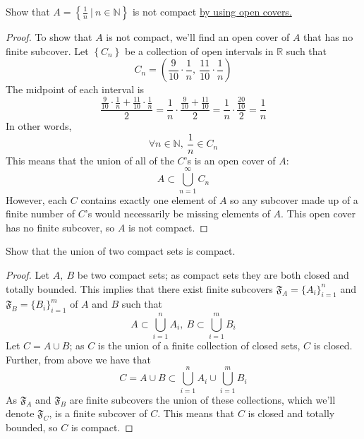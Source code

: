 \documentclass{article}
\newcommand{\parens}[1]{\left(#1\right)}
\newcommand{\bracks}[1]{\left\{#1\right\}}
\newcommand{\R}{\mathbb{R}}
\newcommand{\N}{\mathbb{N}}
\begin{document}
    
    \item Show that $A = \bracks{\frac{1}{n}\ \big|\ n \in \N}$ is 
    not compact \underline{by using open covers.}
    \begin{proof}
    To show that $A$ is not compact, we'll find an open cover of $A$ 
    that has no finite subcover. Let $\bracks{C_n}$ be a collection 
    of open intervals in $\R$ such that 
    $$C_n = \parens{\frac{9}{10}\cdot\frac{1}{n},\ 
    \frac{11}{10}\cdot\frac{1}{n}}$$
    The midpoint of each interval is
    $$\frac{\frac{9}{10}\cdot\frac{1}{n} + 
    \frac{11}{10}\cdot\frac{1}{n}}{2} = \frac{1}{n}\cdot
    \frac{\frac{9}{10}+\frac{11}{10}}{2} = \frac{1}{n}\cdot
    \frac{\frac{20}{10}}{2} = \frac{1}{n}$$
    In other words, 
    $$\forall n \in \N,\ \frac{1}{n} \in C_n$$
    This means that the union of all of the $C$'s is an open cover
    of $A$:
    $$A \subset \bigcup_{n=1}^\infty C_n$$
    However, each $C$ contains exactly one element of $A$ so any
    subcover made up of a finite number of $C$'s would necessarily be
    missing elements of $A$. This open cover has no finite subcover, 
    so $A$ is not compact.  
    \end{proof}
    
    
    \item Show that the union of two compact sets is compact.
    \begin{proof}
    Let $A,\ B$ be two compact sets; as compact sets they are 
    both closed and totally bounded. This implies that there exist 
    finite subcovers $\mathfrak{F}_A = \{A_i\}_{i=1}^n$ and 
    $\mathfrak{F}_B = \{B_i\}_{i=1}^m$ of $A$ and $B$ 
    such that
    $$A \subset \bigcup_{i=1}^n A_i,\ B \subset 
    \bigcup_{i=1}^m B_i$$
    Let $C = A \cup B$; as $C$
    is the union of a finite collection of closed sets, $C$ is 
    closed. Further, from above we have that
    $$C = A \cup B \subset \bigcup_{i=1}^n A_i \cup
    \bigcup_{i=1}^m B_i$$
    As $\mathfrak{F}_A$ and $\mathfrak{F}_B$ are finite subcovers 
    the union of these collections, which we'll denote 
    $\mathfrak{F}_C$, is a finite subcover of $C$. This means that 
    $C$ is closed and totally bounded, so $C$ is compact.
    \end{proof}
    
\end{document}
